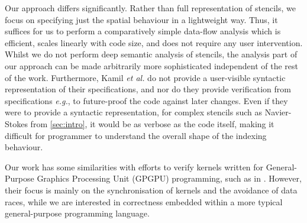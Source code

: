 \documentclass[10pt,preprint,numbers]{sigplanconf}
\theoremstyle{definition}
\newcommand{\eg}{\emph{e.g.}}
\begin{document}

Our approach differs significantly. Rather than 
full representation of stencils, we focus on specifying
just the spatial behaviour in a lightweight way.
Thus, it suffices for us to perform a comparatively
simple data-flow analysis which is efficient, scales linearly with
code size, and does not require any user intervention.
Whilst we do not perform deep semantic analysis of stencils,
 the analysis part of our
approach can be made arbitrarily more sophisticated independent of the rest of
the work.
%
Furthermore, Kamil \emph{et al.} do not provide a user-visible
syntactic representation of their specifications, and nor do
they provide verification from specifications \eg{}, to future-proof
the code against later changes. Even if they were to provide a
syntactic representation, for complex stencils such as Navier-Stokes
from \cref{sec:intro}, it would be as verbose as the code itself,
making it difficult for programmer to understand the overall shape of
the indexing behaviour.

Our work has some similarities with efforts to verify kernels
written for General-Purpose Graphics Processing Unit (GPGPU)
programming, such as in \citet{Blom:2014:SoCP}. %
However, their focus is
mainly on the synchronisation of kernels and the avoidance of
data races, while we are interested in correctness 
embedded within a more typical general-purpose programming
language. %
\end{document}
